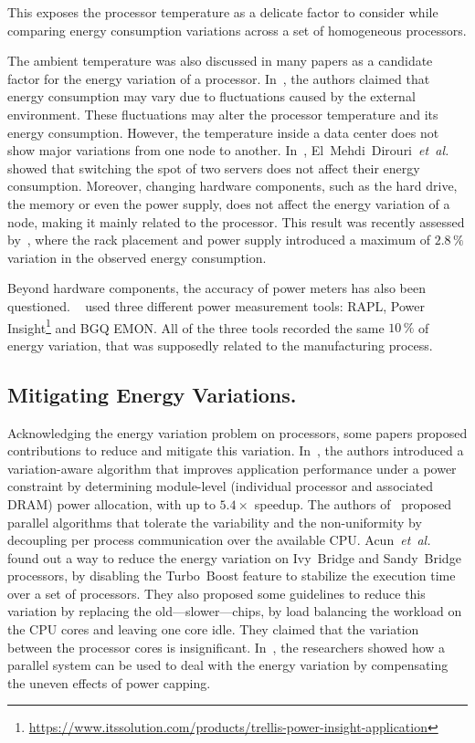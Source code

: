 
This exposes the processor temperature as a delicate factor to consider while comparing energy consumption variations across a set of homogeneous processors.%

The ambient temperature was also discussed in many papers as a candidate factor for the energy variation of a processor.
In~\cite{ranka_energy_2009}, the authors claimed that energy consumption may vary due to fluctuations caused by the external environment.
These fluctuations may alter the processor temperature and its energy consumption.
However, the temperature inside a data center does not show major variations from one node to another.
In~\cite{el_mehdi_diouri_your_2013}, El~Mehdi~Dirouri~\emph{et~al.} showed that switching the spot of two servers does not affect their energy consumption.
Moreover, changing hardware components, such as the hard drive, the memory or even the power supply, does not affect the energy variation of a node, making it mainly related to the processor.
This result was recently assessed by~\cite{wang_potential_2018}, where the rack placement and power supply introduced a maximum of $2.8\,\%$ variation in the observed energy consumption.

Beyond hardware components, the accuracy of power meters has also been questioned.
\citeauthor{inadomi_analyzing_2015}~\cite{inadomi_analyzing_2015} used three different power measurement tools: RAPL, Power Insight\footnote{\url{https://www.itssolution.com/products/trellis-power-insight-application}} and BGQ EMON.
All of the three tools recorded the same $10\,\%$ of energy variation, that was supposedly related to the manufacturing process.

\subsection{Mitigating Energy Variations.}
Acknowledging the energy variation problem on processors, some papers proposed contributions to reduce and mitigate this variation.
In~\cite{inadomi_analyzing_2015}, the authors introduced a variation-aware algorithm that improves application performance under a power constraint by determining module-level (individual processor and associated DRAM) power allocation, with up to $5.4\times$ speedup.
The authors of~\cite{hammouda_noise-tolerant_2015} proposed parallel algorithms that tolerate the variability and the non-uniformity by decoupling per process communication over the available CPU.
Acun~\emph{et~al.}~\cite{acun_variation_2016} found out a way to reduce the energy variation on Ivy~Bridge and Sandy~Bridge processors, by disabling the Turbo~Boost feature to stabilize the execution time over a set of processors.
They also proposed some guidelines to reduce this variation by replacing the old---slower---chips, by load balancing the workload on the CPU cores and leaving one core idle.
They claimed that the variation between the processor cores is insignificant.
In~\cite{chasapis_runtime-guided_2016}, the researchers showed how a parallel system can be used to deal with the energy variation by compensating the uneven effects of power capping.

